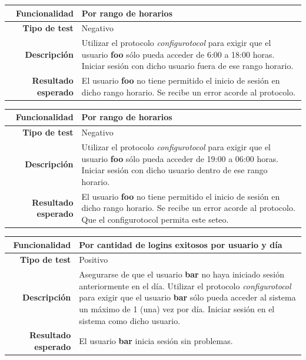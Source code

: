 \documentclass[a4paper,10pt]{article}
\begin{document}
\begin{center}
  \begin{tabular}{|r|p{12.5cm}|}
    \hline
    \textbf{Funcionalidad}	&	Por rango de horarios\\
    \hline
    \textbf{Tipo de test}	&	Negativo\\
    \hline
    \textbf{Descripción}	&	Utilizar el protocolo \textit{configurotocol} para exigir que el usuario
					\textbf{foo} sólo pueda acceder de 6:00 a 18:00 horas. Iniciar sesión con
					dicho usuario fuera de ese rango horario.\\
    \hline
    \textbf{Resultado esperado}	&	El usuario \textbf{foo} no tiene permitido el inicio de sesión en dicho
					rango horario. Se recibe un error acorde al protocolo.\\
    \hline   
  \end{tabular}
\end{center}

\begin{center}
  \begin{tabular}{|r|p{12.5cm}|}
    \hline
    \textbf{Funcionalidad}	&	Por rango de horarios\\
    \hline
    \textbf{Tipo de test}	&	Negativo\\
    \hline
    \textbf{Descripción}	&	Utilizar el protocolo \textit{configurotocol} para exigir que el usuario
					\textbf{foo} sólo pueda acceder de 19:00 a 06:00 horas. Iniciar sesión con
					dicho usuario dentro de ese rango horario.\\
    \hline
    \textbf{Resultado esperado}	&	El usuario \textbf{foo} no tiene permitido el inicio de sesión en dicho
					rango horario. Se recibe un error acorde al protocolo. Que el configurotocol permita este seteo.\\
    \hline   
  \end{tabular}
\end{center}

\begin{center}
  \begin{tabular}{|r|p{12.5cm}|}
    \hline
    \textbf{Funcionalidad}	&	Por cantidad de logins exitosos por usuario y día\\
    \hline
    \textbf{Tipo de test}	&	Positivo\\
    \hline
    \textbf{Descripción}	&	Asegurarse de que el usuario \textbf{bar} no haya iniciado sesión
					anteriormente en el día.
					Utilizar el protocolo \textit{configurotocol} para exigir que el usuario
					\textbf{bar} sólo pueda acceder al sistema un máximo de 1 (una) vez
					por día. Iniciar sesión en el sistema como dicho usuario.\\
    \hline
    \textbf{Resultado esperado}	&	El usuario \textbf{bar} inicia sesión sin problemas.\\
    \hline   
  \end{tabular}
\end{center}
\end{document}

